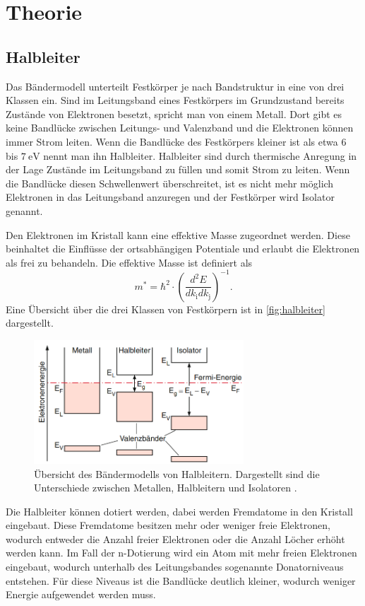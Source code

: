 \section{Theorie}
\label{sec:Theorie}

\subsection{Halbleiter}
\label{ssec:halbleiter}

Das Bändermodell unterteilt Festkörper je nach Bandstruktur in eine von drei Klassen ein.
Sind im Leitungsband eines Festkörpers im Grundzustand bereits Zustände von Elektronen besetzt, spricht man von einem Metall.
Dort gibt es keine Bandlücke zwischen Leitungs- und Valenzband und die Elektronen können immer Strom leiten.
Wenn die Bandlücke des Festkörpers kleiner ist als etwa $\qty{6}{}$ bis $\qty{7}{\eV}$ nennt man ihn Halbleiter.
Halbleiter sind durch thermische Anregung in der Lage Zustände im Leitungsband zu füllen und somit Strom zu leiten.
Wenn die Bandlücke diesen Schwellenwert überschreitet, ist es nicht mehr möglich Elektronen in das Leitungsband anzuregen und der Festkörper wird Isolator genannt.

Den Elektronen im Kristall kann eine effektive Masse zugeordnet werden.
Diese beinhaltet die Einflüsse der ortsabhängigen Potentiale und erlaubt die Elektronen als frei zu behandeln.
Die effektive Masse ist definiert als
\begin{equation}
    m^* = \hbar^2 \cdot \left(\frac{d ^2 E}{d k_\text{i} d k_\text{j}} \right)^{-1}.
\end{equation}
Eine Übersicht über die drei Klassen von Festkörpern ist in \autoref{fig:halbleiter} dargestellt.
\begin{figure}
    \centering
    \includegraphics[width=0.7\textwidth]{figure/halbleiter.png}
    \caption{Übersicht des Bändermodells von Halbleitern. Dargestellt sind die Unterschiede zwischen Metallen, Halbleitern und Isolatoren \cite{demtroder}.}
    \label{fig:halbleiter}
\end{figure}
Die Halbleiter können dotiert werden, dabei werden Fremdatome in den Kristall eingebaut.
Diese Fremdatome besitzen mehr oder weniger freie Elektronen, wodurch entweder die Anzahl freier Elektronen oder die Anzahl Löcher erhöht werden kann.
Im Fall der n-Dotierung wird ein Atom mit mehr freien Elektronen eingebaut, wodurch unterhalb des Leitungsbandes sogenannte Donatorniveaus entstehen.
Für diese Niveaus ist die Bandlücke deutlich kleiner, wodurch weniger Energie aufgewendet werden muss.

